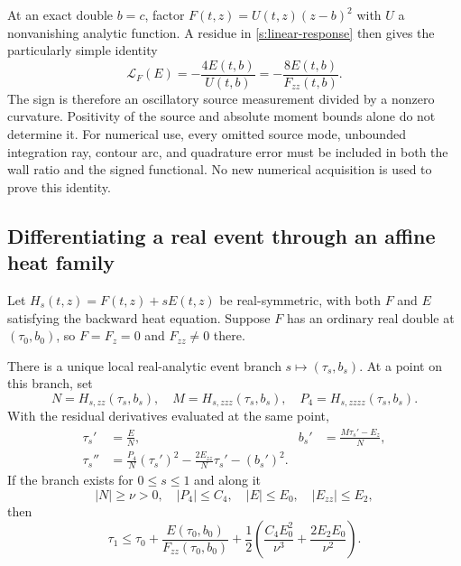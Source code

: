 At an exact double $b=c$, factor $F(t,z)=U(t,z)(z-b)^2$ with $U$ a
nonvanishing analytic function.  A residue in
\eqref{s:linear-response} then gives the particularly simple identity
\begin{equation}
 \mathcal L_F(E)=-\frac{4E(t,b)}{U(t,b)}
               =-\frac{8E(t,b)}{F_{zz}(t,b)}.
 \label{s:double-response}
\end{equation}
The sign is therefore an oscillatory source measurement divided by a
nonzero curvature.  Positivity of the source and absolute moment bounds
alone do not determine it.  For numerical use, every omitted source
mode, unbounded integration ray, contour arc, and quadrature error must
be included in both the wall ratio and the signed functional.  No new
numerical acquisition is used to prove this identity.

\subsection{Differentiating a real event through an affine heat family}

Let $H_s(t,z)=F(t,z)+sE(t,z)$ be real-symmetric, with both $F$ and $E$
satisfying the backward heat equation.  Suppose $F$ has an ordinary real
double at $(\tau_0,b_0)$, so $F=F_z=0$ and $F_{zz}\ne0$ there.

\begin{proposition}
\label{s:event-derivatives}
There is a unique local real-analytic event branch
$s\mapsto(\tau_s,b_s)$.  At a point on this branch, set
\[
 N=H_{s,zz}(\tau_s,b_s),\quad M=H_{s,zzz}(\tau_s,b_s),\quad
 P_4=H_{s,zzzz}(\tau_s,b_s).
\]
With the residual derivatives evaluated at the same point,
\begin{align}
 \tau_s'&=\frac{E}{N}, &
 b_s'&=\frac{M\tau_s'-E_z}{N},\label{s:event-first}\\
 \tau_s''&=\frac{P_4}{N}(\tau_s')^2
          -\frac{2E_{zz}}{N}\tau_s'-(b_s')^2.
 \label{s:event-second}
\end{align}
If the branch exists for $0\le s\le1$ and along it
\[
 |N|\ge\nu>0,\quad |P_4|\le C_4,\quad |E|\le E_0,
 \quad |E_{zz}|\le E_2,
\]
then
\begin{equation}
 \tau_1\le\tau_0+\frac{E(\tau_0,b_0)}{F_{zz}(\tau_0,b_0)}
       +\frac12\left(\frac{C_4E_0^2}{\nu^3}
                         +\frac{2E_2E_0}{\nu^2}\right).
 \label{s:event-location}
\end{equation}
\end{proposition}

